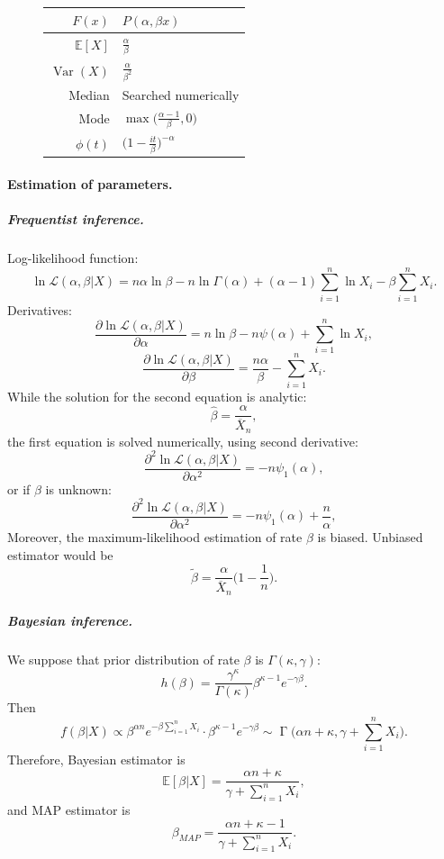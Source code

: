 \documentclass[a4paper,11pt]{article}
\theoremstyle{plain}
\theoremstyle{definition}
\newcommand{\ME}{\mathbb{E}}
\newcommand{\Var}{\operatorname{Var}}
\begin{document}
\begin{figure}[!htb]
\begin{minipage}{0.4\textwidth}
\begin{tabular}{| r | l |}
				\hline
				$F(x)$ & $P(\alpha, \beta x) $\\
				\hline
				$\ME[X]$ & $ \frac{\alpha}{\beta}$ \\
				\hline
				$\Var(X)$ & $\frac{\alpha}{\beta^2}$ \\
				\hline
				Median & Searched numerically \\
				\hline
				Mode & $\max\big(\frac{\alpha - 1}{\beta}, 0\big)$ \\
				\hline
				$\phi(t)$ & $ \Big( 1-\frac{it}{\beta} \Big)^{-\alpha}$ \\
				\hline
			\end{tabular}
		\end{minipage}
	\end{figure}
	
	\paragraph{Estimation of parameters.}
	\subparagraph{Frequentist inference.} Log-likelihood function:
	\[
	\ln \mathcal{L}(\alpha, \beta|X) =  n \alpha \ln \beta - n \ln \Gamma(\alpha) + (\alpha - 1) \sum_{i=1}^{n} \ln X_i - \beta \sum_{i=1}^{n} X_i.
	\]
	Derivatives:
	\[
	\frac{\partial \ln \mathcal{L}(\alpha, \beta | X) }{\partial \alpha} = n \ln \beta - n \psi (\alpha) + \sum_{i=1}^{n} \ln X_i,
	\]
	\[
	\frac{\partial \ln \mathcal{L}(\alpha, \beta | X) }{\partial \beta} = \frac{n \alpha}{\beta} - \sum_{i=1}^{n} X_i.
	\]
	While the solution for the second equation is analytic:
	\[
	\hat{\beta} = \frac{\alpha}{\overline{X}_n},
	\]
	the first equation is solved numerically, using second derivative:
	\[
	\frac{\partial^2 \ln \mathcal{L}(\alpha, \beta | X) }{\partial \alpha^2} = - n \psi_1 (\alpha),
	\]
	or if $\beta$ is unknown:
	\[
	\frac{\partial^2 \ln \mathcal{L}(\alpha, \beta | X) }{\partial \alpha^2} = - n \psi_1 (\alpha) + \frac{n}{\alpha},
	\]
	Moreover, the maximum-likelihood estimation of rate $\beta$ is biased. Unbiased estimator would be
	\[
	\tilde{\beta} = \frac{\alpha}{\overline{X}_n} \Big(1 - \frac{1}{n}\Big).
	\]
	\subparagraph{Bayesian inference.} We suppose that prior distribution of rate $\beta$ is $\Gamma(\kappa, \gamma)$:
	\[
	h(\beta) = \frac{\gamma^\kappa}{\Gamma(\kappa)} \beta^{\kappa-1}e^{-\gamma \beta}.
	\]
	Then
	\[
	f(\beta | X) \propto \beta^{\alpha n} e^{-\beta \sum_{i=1}^{n} X_i } \cdot \beta^{\kappa-1}e^{-\gamma \beta} \sim \operatorname{\Gamma}\Big(\alpha n + \kappa, \gamma +\sum_{i=1}^{n} X_i \Big).
	\]
	Therefore, Bayesian estimator is
	\[
	\ME[\beta|X] = \frac{\alpha n + \kappa}{\gamma +\sum_{i=1}^{n} X_i},
	\]
	and MAP estimator is
	\[
	\beta_{MAP} = \frac{\alpha n + \kappa - 1}{\gamma +\sum_{i=1}^{n} X_i}.
	\]
	
\end{document}
